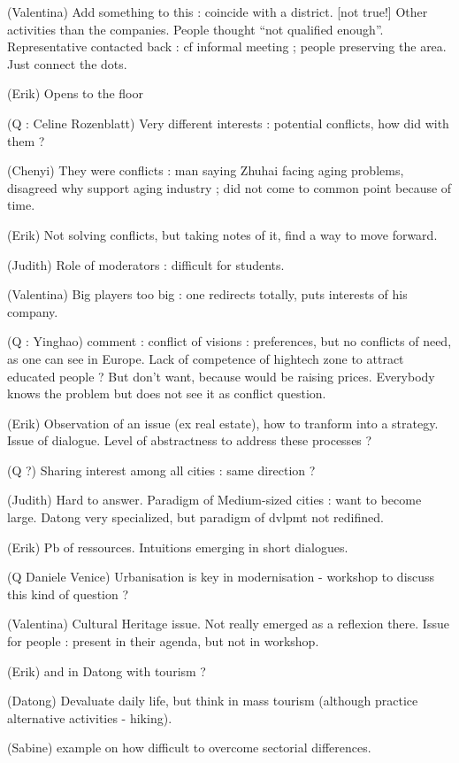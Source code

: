 (Valentina) Add something to this : coincide with a district. [not true!] Other activities than the companies. People thought ``not qualified enough''. Representative contacted back : cf informal meeting ; people preserving the area. Just connect the dots.

(Erik) Opens to the floor


(Q : Celine Rozenblatt) Very different interests : potential conflicts, how did with them ?

(Chenyi) They were conflicts : man saying Zhuhai facing aging problems, disagreed why support aging industry ; did not come to common point because of time.

(Erik) Not solving conflicts, but taking notes of it, find a way to move forward.

(Judith) Role of moderators : difficult for students. 

(Valentina) Big players too big : one redirects totally, puts interests of his company.

(Q : Yinghao) comment : conflict of visions : preferences, but no conflicts of need, as one can see in Europe. Lack of competence of hightech zone to attract educated people ? But don't want, because would be raising prices. Everybody knows the problem but does not see it as conflict question.

(Erik) Observation of an issue (ex real estate), how to tranform into a strategy. Issue of dialogue. Level of abstractness to address these processes ?


(Q ?) Sharing interest among all cities : same direction ? 

(Judith) Hard to answer. Paradigm of Medium-sized cities : want to become large. Datong very specialized, but paradigm of dvlpmt not redifined.

(Erik) Pb of ressources. Intuitions emerging in short dialogues. 

(Q Daniele Venice) Urbanisation is key in modernisation - workshop to discuss this kind of question ? 

(Valentina) Cultural Heritage issue. Not really emerged as a reflexion there. Issue for people : present in their agenda, but not in workshop.

(Erik) and in Datong with tourism ?

(Datong) Devaluate daily life, but think in mass tourism (although practice alternative activities - hiking).

(Sabine) example on how difficult to overcome sectorial differences.

